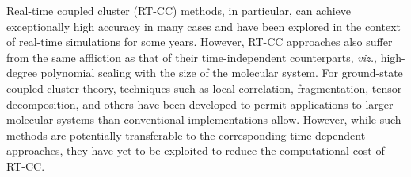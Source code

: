 Real-time coupled cluster (RT-CC) methods, in particular, can achieve
exceptionally high accuracy in many cases\cite{Bartlett2010,
Crawford2000} and have been explored in the context of real-time
simulations for some years.\cite{Huber2011, Pedersen2019, Kristiansen2020,
Pedersen2020,
Nascimento2016linear, Nascimento2017, Nascimento2019, Koulias2019, Vila2020,
Park2019, Park2021, Cooper2021} However, RT-CC approaches also suffer from
the same affliction as that of their time-independent counterparts,
\textit{viz.}, high-degree polynomial scaling with the size of the molecular
system.  For ground-state coupled cluster theory, techniques such as local
correlation, \cite{Pulay1983, Hampel1996, Neese2009, Schutz2001,Yang2012,
Russ2004, McAlexander2012, Crawford2019} fragmentation,\cite{Gordon2012,
Epifanovsky2013, Li2004, Li2009} tensor decomposition,\cite{Kinoshita2003,
Koch2003, Hohenstein2012, Schutski2017, Parrish2019, Pawlowski2019} and others
have been developed to permit applications to larger molecular systems than
conventional implementations allow.  However, while such methods are
potentially transferable to the corresponding time-dependent approaches, they
have yet to be exploited to reduce the computational cost of RT-CC.

